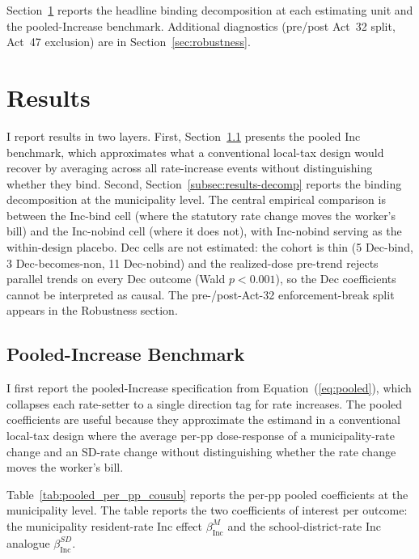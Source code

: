 \documentclass[12pt]{article}
\begin{document}
Section~\ref{sec:results} reports the headline binding
decomposition at each estimating unit and the pooled-Increase
benchmark. Additional diagnostics (pre/post Act~32 split, Act~47
exclusion) are in Section~\ref{sec:robustness}.


\section{Results}
\label{sec:results}

I report results in two layers. First,
Section~\ref{subsec:results-pooled} presents the pooled Inc
benchmark, which approximates what a conventional local-tax design
would recover by averaging across all rate-increase events without
distinguishing whether they bind. Second,
Section~\ref{subsec:results-decomp} reports the binding
decomposition at the municipality level. The central empirical
comparison is between the Inc-bind cell (where the statutory rate
change moves the worker's bill) and the Inc-nobind cell (where it
does not), with Inc-nobind serving as the within-design placebo.
Dec cells are not estimated: the cohort is thin
(5 Dec-bind, 3 Dec-becomes-non, 11 Dec-nobind) and the
realized-dose pre-trend rejects parallel trends on every Dec
outcome (Wald $p<0.001$), so the Dec coefficients cannot be
interpreted as causal. The pre-/post-Act-32 enforcement-break split
appears in the Robustness section.

\subsection{Pooled-Increase Benchmark}
\label{subsec:results-pooled}

I first report the pooled-Increase specification from
Equation~(\ref{eq:pooled}), which collapses each rate-setter to a
single direction tag for rate increases. The pooled coefficients
are useful because they approximate the estimand in a conventional
local-tax design where the average per-pp dose-response of a
municipality-rate change and an SD-rate change without
distinguishing whether the rate change moves the worker's bill.

Table~\ref{tab:pooled_per_pp_cousub} reports the per-pp pooled
coefficients at the municipality level. The table reports the two
coefficients of interest per outcome: the municipality resident-rate
Inc effect $\beta^M_{\text{Inc}}$ and the school-district-rate Inc
analogue $\beta^{SD}_{\text{Inc}}$.
\end{document}
